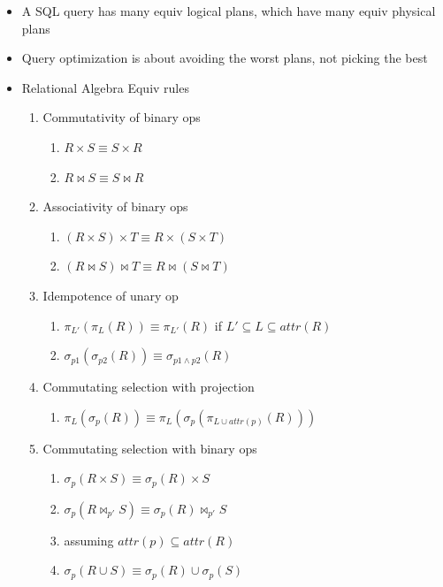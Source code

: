 \documentclass[9pt, landscape]{extarticle}
\begin{document}
\begin{multicols*}{4}
  \begin{itemize}
    \item A SQL query has many equiv logical plans, which have many equiv physical plans
    \item Query optimization is about avoiding the worst plans, not picking the best
    \item Relational Algebra Equiv rules
    \begin{enumerate}
      \item Commutativity of binary ops
      \begin{enumerate}
        \item $R \times S \equiv S \times R$
        \item $R \bowtie S \equiv S \bowtie R$ 
      \end{enumerate}
      \item Associativity of binary ops
      \begin{enumerate}
        \item $(R \times S) \times T \equiv R \times (S \times T)$
        \item $(R \bowtie S) \bowtie T \equiv R \bowtie (S \bowtie T)$
      \end{enumerate}
      \item Idempotence of unary op
      \begin{enumerate}
        \item $\pi_{L'}(\pi_{L}(R)) \equiv \pi_{L'}(R)$ if $L' \subseteq L \subseteq attr(R)$
        \item $\sigma_{p1}(\sigma_{p2}(R)) \equiv \sigma_{p1 \wedge p2}(R)$
      \end{enumerate}
      \item Commutating selection with projection
      \begin{enumerate}
        \item $\pi_L(\sigma_p(R)) \equiv \pi_L(\sigma_p(\pi_{L \cup attr(p)}(R)))$
      \end{enumerate}
      \item Commutating selection with binary ops
      \begin{enumerate}
        \item $\sigma_p(R \times S) \equiv \sigma_p(R) \times S$
        \item $\sigma_p(R \bowtie_{p'} S) \equiv \sigma_p(R) \bowtie_{p'} S$
        \item assuming $attr(p) \subseteq attr(R)$
        \item $\sigma_p(R \cup S) \equiv \sigma_p(R) \cup \sigma_p(S)$

\end{enumerate}
\end{enumerate}
\end{itemize}
\end{multicols*}
\end{document}

